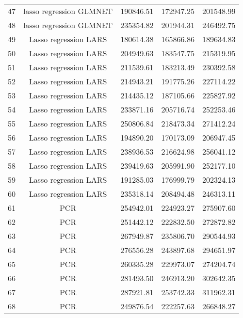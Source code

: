 \begin{tabular}{ccccc}
  47 & lasso regression GLMNET & 190846.51 & 172947.25 & 201548.99 \\ 
  48 & lasso regression GLMNET & 235354.82 & 201944.31 & 246492.75 \\ 
  49 & Lasso regression LARS & 180614.38 & 165866.86 & 189634.83 \\ 
  50 & Lasso regression LARS & 204949.63 & 183547.75 & 215319.95 \\ 
  51 & Lasso regression LARS & 211539.61 & 183213.49 & 230392.58 \\ 
  52 & Lasso regression LARS & 214943.21 & 191775.26 & 227114.22 \\ 
  53 & Lasso regression LARS & 214435.12 & 187105.66 & 225827.92 \\ 
  54 & Lasso regression LARS & 233871.16 & 205716.74 & 252253.46 \\ 
  55 & Lasso regression LARS & 250806.84 & 218473.34 & 271412.24 \\ 
  56 & Lasso regression LARS & 194890.20 & 170173.09 & 206947.45 \\ 
  57 & Lasso regression LARS & 238936.53 & 216624.98 & 256041.12 \\ 
  58 & Lasso regression LARS & 239419.63 & 205991.90 & 252177.10 \\ 
  59 & Lasso regression LARS & 191285.03 & 176999.79 & 202324.13 \\ 
  60 & Lasso regression LARS & 235318.14 & 208494.48 & 246313.11 \\ 
  61 & PCR & 254942.01 & 224923.27 & 275907.60 \\ 
  62 & PCR & 251442.12 & 222832.50 & 272872.82 \\ 
  63 & PCR & 267949.87 & 235806.70 & 290544.93 \\ 
  64 & PCR & 276556.28 & 243897.68 & 294651.97 \\ 
  65 & PCR & 260335.28 & 229973.07 & 274204.74 \\ 
  66 & PCR & 281493.50 & 246913.20 & 302642.35 \\ 
  67 & PCR & 287921.81 & 253742.33 & 311962.31 \\ 
  68 & PCR & 249876.54 & 222257.63 & 266848.27 \\ 
   \hline
\end{tabular}
